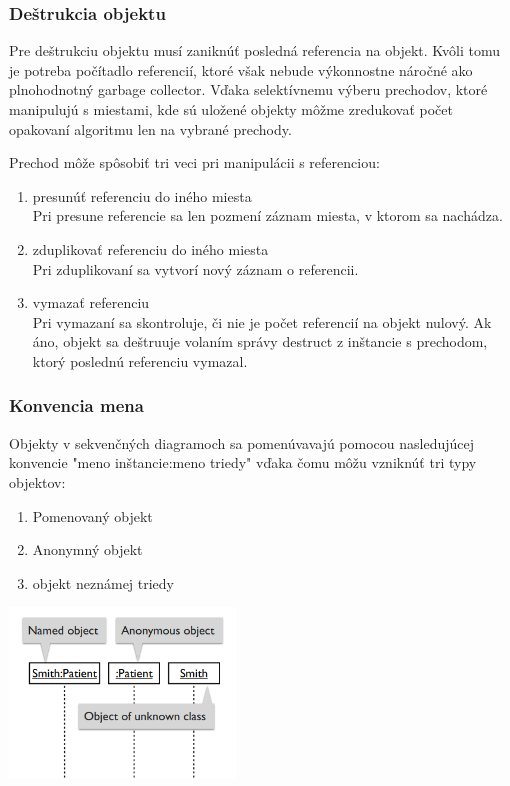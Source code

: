 \subsubsection*{Deštrukcia objektu}
Pre deštrukciu objektu musí zaniknúť posledná referencia na objekt. Kvôli tomu je potreba počítadlo referencií, ktoré však nebude výkonnostne náročné ako plnohodnotný garbage collector. Vďaka selektívnemu výberu prechodov, ktoré manipulujú s miestami, kde sú uložené objekty môžme zredukovať počet opakovaní algoritmu len na vybrané prechody.
\pagebreak

Prechod môže spôsobiť tri veci pri manipulácii s referenciou:
\begin{enumerate}
	\item presunúť referenciu do iného miesta\\
	Pri presune referencie sa len pozmení záznam miesta, v ktorom sa nachádza.
	\item zduplikovať referenciu do iného miesta\\
	Pri zduplikovaní sa vytvorí nový záznam o referencii.
	\item vymazať referenciu \\
	Pri vymazaní sa skontroluje, či nie je počet referencií na objekt nulový. Ak áno, objekt sa deštruuje volaním správy destruct z inštancie s prechodom, ktorý poslednú referenciu vymazal.
\end{enumerate}


\subsubsection*{Konvencia mena}

Objekty v sekvenčných diagramoch sa pomenúvavajú pomocou nasledujúcej konvencie "meno inštancie:meno triedy" vďaka čomu môžu vzniknúť tri typy objektov:


\begin{minipage}[c]{0.45\textwidth}
\begin{enumerate}
	\item Pomenovaný objekt
	\item Anonymný objekt
	\item objekt neznámej triedy
\end{enumerate}
\end{minipage}
\hfill
\begin{minipage}[c]{0.8\textwidth}
	\includegraphics[width=0.45\textwidth]{obrazky-figures/names}
\end{minipage}



